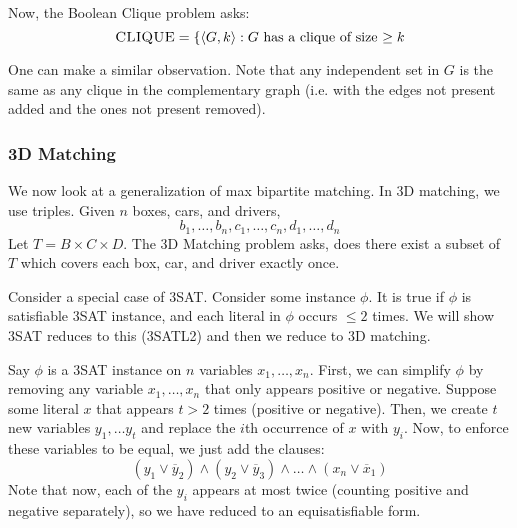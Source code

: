 Now, the Boolean Clique problem asks:
\[ \textsc{CLIQUE} = \{ \langle G, k \rangle : G \text{ has a clique of size $\geq k$} \]

One can make a similar observation. Note that any independent set in $G$ is the same as any clique in the complementary graph (i.e. with the edges
not present added and the ones not present removed).

\subsubsection{3D Matching}

We now look at a generalization of max bipartite matching. In 3D matching, we use triples. Given $n$ boxes, cars, and drivers,
\[ b_1, \dots, b_n, c_1, \dots, c_n, d_1, \dots, d_n \]
Let $T = B \times C \times D$. The 3D Matching problem asks, does there exist a subset of $T$ which covers each box, car, and driver exactly once.

Consider a special case of 3SAT.
Consider some instance $\phi$. It is true if $\phi$ is satisfiable 3SAT instance, and each literal in $\phi$ occurs $\leq 2$ times.
We will show 3SAT reduces to this (3SATL2) and then we reduce to 3D matching.
\begin{algothm}
    Say $\phi$ is a 3SAT instance on $n$ variables $x_1, \dots, x_n$.
    First, we can simplify $\phi$ by removing any variable $x_1, \dots, x_n$ that only appears positive or negative. 
    Suppose some literal $x$ that appears $t > 2$ times (positive or negative). Then, we create $t$ new variables $y_1, \dots y_t$ and replace the $i$th occurrence
    of $x$ with $y_i$. Now, to enforce these variables to be equal, we just add the clauses:
    \[ (y_1 \lor \overline{y}_2) \land (y_2 \lor \overline{y}_3) \land \dots \land (x_n \lor \overline{x}_1) \]
    Note that now, each of the $y_i$ appears at most twice (counting positive and negative separately), so we have reduced to an equisatisfiable form.
\end{algothm}

